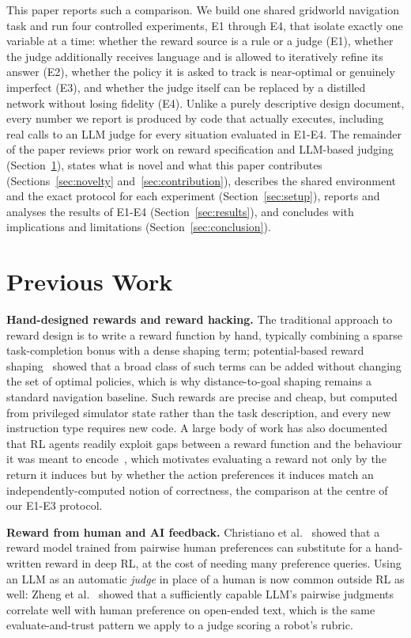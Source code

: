 \documentclass[conference]{IEEEtran}
\begin{document}
This paper reports such a comparison. We build one shared gridworld
navigation task and run four controlled experiments, E1 through E4, that
isolate exactly one variable at a time: whether the reward source is a
rule or a judge (E1), whether the judge additionally receives language
and is allowed to iteratively refine its answer (E2), whether the policy
it is asked to track is near-optimal or genuinely imperfect (E3), and
whether the judge itself can be replaced by a distilled network without
losing fidelity (E4). Unlike a purely descriptive design document, every
number we report is produced by code that actually executes, including
real calls to an LLM judge for every situation evaluated in E1-E4. The
remainder of the paper reviews prior work on reward specification and
LLM-based judging (Section~\ref{sec:related}), states what is novel and
what this paper contributes (Sections~\ref{sec:novelty}
and~\ref{sec:contribution}), describes the shared environment and the
exact protocol for each experiment
(Section~\ref{sec:setup}), reports and analyses the results of E1-E4
(Section~\ref{sec:results}), and concludes with implications and
limitations (Section~\ref{sec:conclusion}).

\section{Previous Work}
\label{sec:related}

\textbf{Hand-designed rewards and reward hacking.} The traditional
approach to reward design is to write a reward function by hand,
typically combining a sparse task-completion bonus with a dense shaping
term; potential-based reward shaping~\cite{ng1999shaping} showed that a
broad class of such terms can be added without changing the set of
optimal policies, which is why distance-to-goal shaping remains a
standard navigation baseline. Such rewards are precise and cheap, but
computed from privileged simulator state rather than the task
description, and every new instruction type requires new code. A large
body of work has also documented that RL agents readily exploit gaps
between a reward function and the behaviour it was meant to
encode~\cite{amodei2016concrete}, which motivates evaluating a reward
not only by the return it induces but by whether the action preferences
it induces match an independently-computed notion of correctness, the
comparison at the centre of our E1-E3 protocol.

\textbf{Reward from human and AI feedback.} Christiano et
al.~\cite{christiano2017rlhf} showed that a reward model trained from
pairwise human preferences can substitute for a hand-written reward in
deep RL, at the cost of needing many preference queries. Using an LLM
as an automatic \emph{judge} in place of a human is now common outside
RL as well: Zheng et al.~\cite{zheng2023judging} showed that a
sufficiently capable LLM's pairwise judgments correlate well with human
preference on open-ended text, which is the same evaluate-and-trust
pattern we apply to a judge scoring a robot's rubric.
\end{document}
